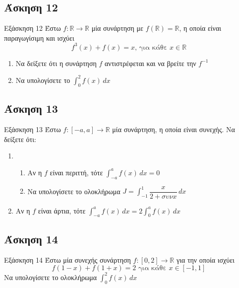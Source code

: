 \documentclass[greek]{beamer}
\begin{document}
\subsection{Άσκηση 12}
\begin{frame}[label=Άσκηση12,t]{Εξάσκηση 12}
 Έστω $f:\mathbb{R}\to\mathbb{R}$ μία συνάρτηση με $f(\mathbb{R})=\mathbb{R}$, η οποία είναι παραγωγίσιμη και ισχύει
 $$f^3(x)+f(x)=x \text{, για κάθε } x\in\mathbb{R}$$
 \begin{enumerate}
   \item<1-> Να δείξετε ότι η συνάρτηση $f$ αντιστρέφεται και να βρείτε την $f^{-1}$
   \item<2-> Να υπολογίσετε το $\int_{0}^{2} f(x) \,dx$
 \end{enumerate}

\end{frame}

\subsection{Άσκηση 13}
\begin{frame}[label=Άσκηση13,t]{Εξάσκηση 13}
 Έστω $f:[-a,a]\to\mathbb{R}$ μία συνάρτηση, η οποία είναι συνεχής. Να δείξετε ότι:
 \begin{enumerate}
   \item
   \begin{enumerate}
     \item<1-> Αν η $f$ είναι περιττή, τότε $\int_{-a}^{a} f(x) \,dx=0$
     \item<2-> Να υπολογίσετε το ολοκλήρωμα $J=\int_{-1}^{1} \dfrac{x}{2+συνx} \,dx$
   \end{enumerate}
   \item<3-> Αν η $f$ είναι άρτια, τότε $\int_{-a}^{a} f(x) \,dx=2\int_{0}^{a} f(x) \,dx$
 \end{enumerate}

\end{frame}

\subsection{Άσκηση 14}
\begin{frame}[label=Άσκηση14,t]{Εξάσκηση 14}
   Έστω μία συνεχής συνάρτηση $f:[0,2]\to\mathbb{R}$ για την οποία ισχύει
   $$f(1-x)+f(1+x)=2\text{ για κάθε }x\in [-1,1]$$
   Να υπολογίσετε το ολοκλήρωμα $\int_{0}^{2} f(x) \,dx$

\end{frame}
\end{document}
